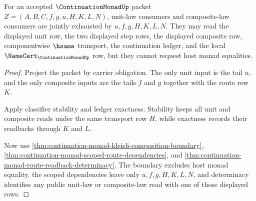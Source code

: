 \begin{theorem}
\label{thm:continuation-monad-unit-composite-readback-totality}
For an accepted $\ContinuationMonadUp$ packet $Z=(A,B,C,f,g,u,H,K,L,N)$, unit-law consumers and composite-law consumers are jointly exhausted by $u,f,g,H,K,L,N$. They may read the displayed unit row, the two displayed step rows, the displayed composite row, componentwise $\hsame$ transport, the continuation ledger, and the local $\NameCert_{\ContinuationMonadUp}$ row, but they cannot request host monad equalities.
\end{theorem}
\begin{proof}
Project the packet by carrier obligation. The only unit input is the tail $u$, and the only composite inputs are the tails $f$ and $g$ together with the route row $K$.

Apply classifier stability and ledger exactness. Stability keeps all unit and composite reads under the same transport row $H$, while exactness records their readbacks through $K$ and $L$.

Now use \autoref{thm:continuation-monad-kleisli-composition-boundary}, \autoref{thm:continuation-monad-scoped-route-dependencies}, and \autoref{thm:continuation-monad-route-readback-determinacy}. The boundary excludes host monad equality, the scoped dependencies leave only $u,f,g,H,K,L,N$, and determinacy identifies any public unit-law or composite-law read with one of those displayed rows.
\end{proof}


